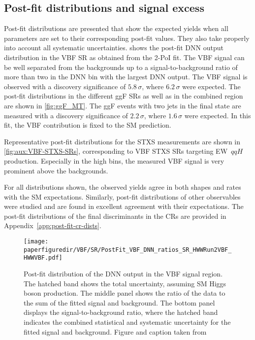 \subsection{Post-fit distributions and signal excess}
Post-fit distributions are presented that show the expected yields when all parameters are set to their corresponding post-fit values. They also take properly into account all systematic uncertainties.  shows the post-fit DNN output distribution in the VBF SR as obtained from the 2-PoI fit.
The VBF signal can be well separated from the backgrounds up to a signal-to-background ratio of more than two in the DNN bin with the largest DNN output.
The VBF signal is observed with a discovery significance of $5.8\,\sigma$, where $6.2\,\sigma$ were expected.
The post-fit \mT distributions in the different ggF SRs as well as in the combined region are shown in \cref{fig:ggF_MT}.
The ggF events with two jets in the final state are measured with a discovery significance of $2.2\,\sigma$, where $1.6\,\sigma$ were expected. In this fit, the VBF contribution is fixed to the SM prediction.

Representative post-fit distributions for the STXS measurements are shown in \cref{fig:aux:VBF-STXS-SRs}, corresponding to VBF STXS SRs targeting EW~$qqH$ production. 
Especially in the high \mjj bins, the measured VBF signal is very prominent above the backgrounds. 

For all distributions shown, the observed yields agree in both shapes and rates with the SM expectations.
Similarly, post-fit distributions of other observables were studied and are found in excellent agreement with their expectations. The post-fit distributions of the final discriminants in the CRs are provided in Appendix~\ref{app:post-fit-cr-dists}. 

\begin{figure}[htb]
  \centering
  \texttt{[image: \\paperfiguredir/VBF/SR/PostFit\_VBF\_DNN\_ratios\_SR\_HWWRun2VBF\_HWWVBF.pdf]}
  \caption{
    Post-fit distribution of the DNN output in the VBF signal region.
    The hatched band shows the total uncertainty, assuming SM Higgs boson production.
    The middle panel shows the ratio of the data to the sum of the fitted signal and background.
    The bottom panel displays the signal-to-background ratio, where the hatched band indicates the combined statistical and systematic uncertainty for the fitted signal and background.
    Figure and caption taken from 
  }
  \label{fig:VBF_DNN}
\end{figure}


